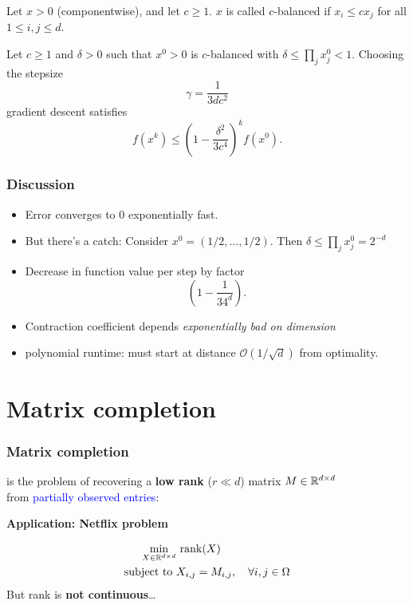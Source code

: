 \documentclass[aspectratio=149]{beamer}
\DeclareMathOperator*{\rank}{rank}
\begin{document}
\begin{frame}
  \frametitle{}
  \begin{definition}
    Let $x > 0$ (componentwise), and let $c \ge 1$. $x$ is called $c$-balanced if $x_i \le cx_j$ for all $1 \le i, j \le d$.
  \end{definition}

  \begin{theorem}
    Let $c\ge 1$ and $\delta> 0$ such that $x^0 > 0$ is $c$-balanced with $\delta \le \prod_j x^0_j < 1$. Choosing the stepsize
    \begin{equation}
      \gamma = \frac{1}{3d c^2}
    \end{equation}
    gradient descent satisfies
    \begin{equation}
      f(x^k) \le {\left( 1- \frac{\delta^2}{3 c^4} \right)}^k f(x^0).
    \end{equation}
  \end{theorem}
\end{frame}


\begin{frame}
  \frametitle{Discussion}

  \begin{itemize}
    \item Error converges to 0 exponentially fast.
    \item But there's a catch: Consider $x^0 = (1/2, \dots, 1/2)$. Then $\delta \le \prod_j x^0_j = 2^{-d}$
    \item Decrease in function value per step by factor
          \begin{equation}
            \left( 1- \frac{1}{3 4^d} \right).
          \end{equation}
    \item Contraction coefficient depends \textit{exponentially bad on dimension}
    \item polynomial runtime: must start at distance $\mathcal{O}(1/\sqrt{d})$ from optimality.
  \end{itemize}
\end{frame}


\section{Matrix completion}%
\label{sec:}

\begin{frame}
  \frametitle{Matrix completion}

  is the problem of recovering a \textbf{low rank} ($r \ll d$) matrix $M \in \mathbb{R}^{d\times d}$ \\
  from \textcolor{blue}{partially observed entries}:
  \begin{block}{}
    \textbf{Application: Netflix problem}
  \end{block}
  \begin{align}
    \min_{X\in \R^{d\times d}} &\, \rank(X) \\
    \text{subject to } & X_{i,j} = M_{i,j}, \quad \forall i,j \in \Omega
  \end{align}
  But rank is \textbf{not continuous}\ldots
\end{frame}
\end{document}
